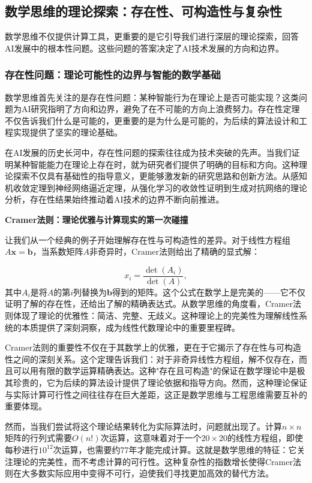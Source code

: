 \subsection{数学思维的理论探索：存在性、可构造性与复杂性}

数学思维不仅提供计算工具，更重要的是它引导我们进行深层的理论探索，回答AI发展中的根本性问题。这些问题的答案决定了AI技术发展的方向和边界。

\subsubsection{存在性问题：理论可能性的边界与智能的数学基础}

数学思维首先关注的是存在性问题：某种智能行为在理论上是否可能实现？这类问题为AI研究指明了方向和边界，避免了在不可能的方向上浪费努力。存在性定理不仅告诉我们什么是可能的，更重要的是为什么是可能的，为后续的算法设计和工程实现提供了坚实的理论基础。

在AI发展的历史长河中，存在性问题的探索往往成为技术突破的先声。当我们证明某种智能能力在理论上存在时，就为研究者们提供了明确的目标和方向。这种理论探索不仅具有基础性的指导意义，更能够激发新的研究思路和创新方法。从感知机收敛定理到神经网络逼近定理，从强化学习的收敛性证明到生成对抗网络的理论分析，存在性结果始终推动着AI技术的边界不断向前推进。

\textbf{Cramer法则：理论优雅与计算现实的第一次碰撞}

让我们从一个经典的例子开始理解存在性与可构造性的差异。对于线性方程组$A\mathbf{x} = \mathbf{b}$，当系数矩阵$A$非奇异时，Cramer法则给出了精确的显式解：

$$x_i = \frac{\det(A_i)}{\det(A)},$$
其中$A_i$是将$A$的第$i$列替换为$\mathbf{b}$得到的矩阵。这个公式在数学上是完美的——它不仅证明了解的存在性，还给出了解的精确表达式。从数学思维的角度看，Cramer法则体现了理论的优雅性：简洁、完整、无歧义。这种理论上的完美性为理解线性系统的本质提供了深刻洞察，成为线性代数理论中的重要里程碑。

Cramer法则的重要性不仅在于其数学上的优雅，更在于它揭示了存在性与可构造性之间的深刻关系。这个定理告诉我们：对于非奇异线性方程组，解不仅存在，而且可以用有限的数学运算精确表达。这种"存在且可构造"的保证在数学理论中是极其珍贵的，它为后续的算法设计提供了理论依据和指导方向。然而，这种理论保证与实际计算可行性之间往往存在巨大差距，这正是数学思维与工程思维需要互补的重要体现。

然而，当我们尝试将这个理论结果转化为实际算法时，问题就出现了。计算$n \times n$矩阵的行列式需要$O(n!)$次运算，这意味着对于一个$20 \times 20$的线性方程组，即使每秒进行$10^{12}$次运算，也需要约$77$年才能完成计算。这就是数学思维的特征：它关注理论的完美性，而不考虑计算的可行性。这种复杂性的指数增长使得Cramer法则在大多数实际应用中变得不可行，迫使我们寻找更加高效的替代方法。

